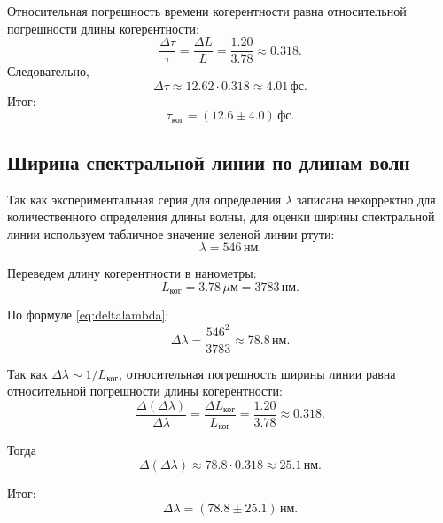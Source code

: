\documentclass[12pt,a4paper]{article}
\newcommand{\um}{\ensuremath{\,\mu\text{м}}}
\newcommand{\nm}{\ensuremath{\,\text{нм}}}
\newcommand{\fs}{\ensuremath{\,\text{фс}}}
\begin{document}
Относительная погрешность времени когерентности равна относительной погрешности длины когерентности:
\begin{equation}
    \frac{\Delta\tau}{\tau}=\frac{\Delta L}{L}=\frac{1.20}{3.78}\approx 0.318.
\end{equation}
Следовательно,
\begin{equation}
    \Delta\tau \approx 12.62\cdot 0.318 \approx 4.01\fs.
\end{equation}
Итог:
\begin{equation}
    \tau_{\text{ког}} = (12.6 \pm 4.0)\fs.
\end{equation}

\subsection{Ширина спектральной линии по длинам волн}

Так как экспериментальная серия для определения $\lambda$ записана некорректно для количественного определения длины волны, для оценки ширины спектральной линии используем табличное значение зеленой линии ртути:
\begin{equation}
    \lambda = 546\nm.
\end{equation}

Переведем длину когерентности в нанометры:
\begin{equation}
    L_{\text{ког}} = 3.78\um = 3783\nm.
\end{equation}

По формуле \eqref{eq:deltalambda}:
\begin{equation}
    \Delta\lambda = \frac{546^2}{3783} \approx 78.8\nm.
\end{equation}

Так как $\Delta\lambda \sim 1/L_{\text{ког}}$, относительная погрешность ширины линии равна относительной погрешности длины когерентности:
\begin{equation}
    \frac{\Delta(\Delta\lambda)}{\Delta\lambda}=\frac{\Delta L_{\text{ког}}}{L_{\text{ког}}}=\frac{1.20}{3.78}\approx 0.318.
\end{equation}

Тогда
\begin{equation}
    \Delta(\Delta\lambda) \approx 78.8\cdot 0.318 \approx 25.1\nm.
\end{equation}

Итог:
\begin{equation}
    \Delta\lambda = (78.8 \pm 25.1)\nm.
\end{equation}
\end{document}
